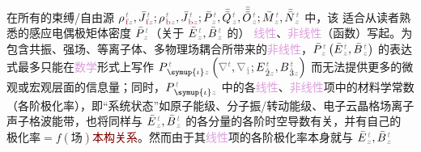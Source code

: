 在所有的束缚/自由源 ${\rho}^{\;\!\mathcolor{gray}{t}}_{\;\!\textcolor{Maroon}{\text{f}}\mathcolor{gray}{z}}, \bar{J}^{\;\!\mathcolor{gray}{t}}_{\;\!\textcolor{Maroon}{\text{f}}\mathcolor{gray}{z}};{\rho}^{\;\!\mathcolor{gray}{t}}_{\;\!\textcolor{Maroon}{\text{b}}\mathcolor{gray}{z}}, \bar{J}^{\;\!\mathcolor{gray}{t}}_{\;\!\textcolor{Maroon}{\text{b}}\mathcolor{gray}{z}};\bar{P}^{\;\!\mathcolor{gray}{t}}_{\;\!\mathcolor{gray}{z}},\bar{\bar{Q}}^{\;\!\mathcolor{gray}{t}}_{\;\!\mathcolor{gray}{z}},\bar{\bar{\bar{O}}}^{\;\!\mathcolor{gray}{t}}_{\;\!\mathcolor{gray}{z}} ; \bar{M}^{\;\!\mathcolor{gray}{t}}_{\;\!\mathcolor{gray}{z}}, \bar{\bar{N}}^{\;\!\mathcolor{gray}{t}}_{\;\!\mathcolor{gray}{z}}$ 中，该  适合从读者熟悉的感应电偶极矩体密度 $\bar{P}^{\;\!\mathcolor{gray}{t}}_{\;\!\mathcolor{gray}{z}}$（关于 $\bar{E}^{\;\!\mathcolor{gray}{t}}_{\;\!\mathcolor{gray}{z}}, \bar{B}^{\;\!\mathcolor{gray}{t}}_{\;\!\mathcolor{gray}{z}}$ 的） \textcolor{Plum}{线性}、\textcolor{Plum}{非线性}（函数）写起。为包含\textcolor{NavyBlue}{共振}、强场、等离子体、\textcolor{NavyBlue}{多物理场耦合}所带来的\textcolor{Plum}{非线性}，$\bar{P}^{\;\!\mathcolor{gray}{t}}_{\;\!\mathcolor{gray}{z}} \left( \bar{E}^{\;\!\mathcolor{gray}{t}}_{\;\!\mathcolor{gray}{z}}, \bar{B}^{\;\!\mathcolor{gray}{t}}_{\;\!\mathcolor{gray}{z}} \right)$ 的表达式最多只能在\textcolor{Plum}{数学}形式上写作 $P^{\;\!\mathcolor{gray}{t}}_{\;\! \symup{\iota}\mathcolor{gray}{z}} \left( \mathcolor{gray}{\nabla^t}, \mathcolor{gray}{\nabla_{\hat{1}}} ; E^{\;\!\mathcolor{gray}{t}}_{\;\! \hat{2}\mathcolor{gray}{z}}, B^{\;\!\mathcolor{gray}{t}}_{\;\! \hat{3}\mathcolor{gray}{z}} \right)$ 而无法提供更多的微观或宏观层面的信息量；同时，$P^{\;\!\mathcolor{gray}{t}}_{\;\! \symup{\iota}\mathcolor{gray}{z}}$ 中的各\textcolor{Plum}{线性}、\textcolor{Plum}{非线性}项中的材料学常数（各阶极化率），即“系统状态”如原子能级、分子振/转动能级、电子云晶格场离子声子格波能带，也将同样与 $\bar{E}^{\;\!\mathcolor{gray}{t}}_{\;\!\mathcolor{gray}{z}}, \bar{B}^{\;\!\mathcolor{gray}{t}}_{\;\!\mathcolor{gray}{z}}$ 的各分量的各阶时空导数有关，并有自己的$\text{极化率} = f(\text{场})$\textcolor{Maroon}{本构关系}。然而由于其\textcolor{Plum}{线性}项的各阶极化率本身就与 $\bar{E}^{\;\!\mathcolor{gray}{t}}_{\;\!\mathcolor{gray}{z}}, \bar{B}^{\;\!\mathcolor{gray}{t}}_{\;\!\mathcolor{gray}{z}}$ 